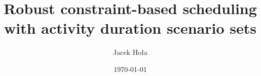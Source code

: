 \documentclass{article}
\theoremstyle{definition}
\begin{document}
 

\title{Robust constraint-based scheduling with activity duration scenario sets}
\author{Jacek Hoła}
\date{\today}
\maketitle
\end{document}
